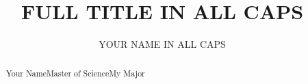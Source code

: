 \documentclass[12pt]{osuthesis}
\title{FULL TITLE IN ALL CAPS}
\author{YOUR NAME IN ALL CAPS}
\begin{document}
\maketitle
\makecopyright
{} %
\begin{acknowledge}

\end{acknowledge}
\tableofcontents
\listoftables
\listoffigures

%	

\setcounter{page}{1}




%
\nocite{*} %

\appendix


 \begin{abstract}{Your Name}{Master of Science}{My Major} %
    
 \end{abstract}
\end{document}
